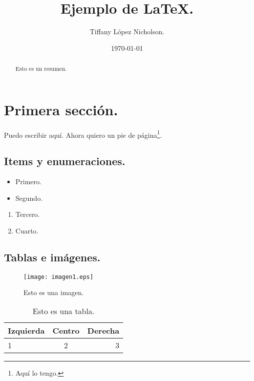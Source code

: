 \documentclass{article}
\begin{document}
  \title{Ejemplo de \LaTeX.}
  \author{Tiffany López Nicholson.}
  \date{\today}
  \maketitle

  \begin{abstract}
    \begin{center}
      Esto es un resumen.
    \end{center}
  \end{abstract}

  \section{Primera sección.}
    Puedo escribir aquí. Ahora quiero un pie de página\footnote{Aquí lo tengo.}.
    \subsection{Items y enumeraciones.}
      \begin{itemize}
        \item Primero.
	\item Segundo.
      \end{itemize}
      \begin{enumerate}
        \item Tercero.
	\item Cuarto.
      \end{enumerate}
   \pagebreak
      
    \subsection{Tablas e imágenes.}
      \begin{figure}
	\begin{center}
	\texttt{[image: imagen1.eps]}
	\caption{Esto es una imagen.}
	\end{center}
      \end{figure}

      \begin{table}
	\begin{center}
	\begin{tabular}{|l|c|r|}
	  \hline
	  {\bf Izquierda} & {\bf Centro} & {\bf Derecha} \\ \hline
	  1 & 2 & 3 \\ \hline
	\end{tabular}
	\caption{Esto es una tabla.}
	\end{center}
      \end{table}
\end{document}
